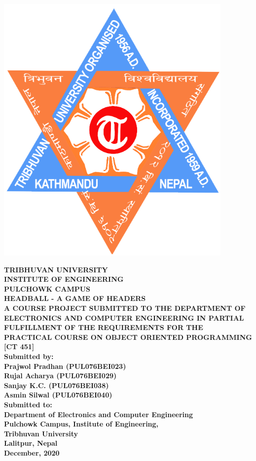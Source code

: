 \documentclass[main.tex]{subfiles}
\begin{document}
\begin{titlepage}
	\begin{center}

	\includegraphics[scale=0.2]{graphics/tu_logo.png}

\textbf{	TRIBHUVAN UNIVERSITY\\
	INSTITUTE OF ENGINEERING\\
	PULCHOWK CAMPUS}\\
	[2cm]

\textbf{	HEADBALL - A GAME OF HEADERS}\\
	[2cm]

\textbf{	A COURSE PROJECT SUBMITTED TO THE DEPARTMENT OF ELECTRONICS AND COMPUTER ENGINEERING IN PARTIAL FULFILLMENT OF THE REQUIREMENTS FOR THE PRACTICAL COURSE ON OBJECT ORIENTED PROGRAMMING [CT 451]}\\
	[2cm]

\textbf{	Submitted by:\\
	Prajwol Pradhan (PUL076BEI023)\\
	Rujal Acharya (PUL076BEI029)\\
	Sanjay K.C. (PUL076BEI038)\\
	Asmin Silwal (PUL076BEI040)}\\
	[1cm]

\textbf{Submitted to:\\
	Department of Electronics and Computer Engineering\\
	Pulchowk Campus, 	Institute of Engineering,\\ Tribhuvan University\\
	Lalitpur, Nepal}\\
	[1.5cm]

\textbf{	December, 2020}

	\end{center}
\end{titlepage} 
\end{document}
